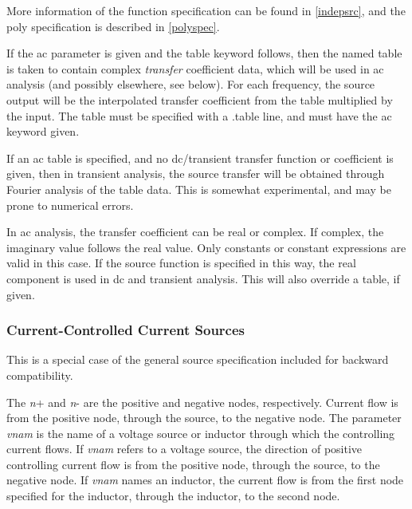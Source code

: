 More information of the function specification can be found in
\ref{indepsrc}, and the {\vt poly} specification is described in
\ref{polyspec}.

If the {\vt ac} parameter is given and the {\vt table} keyword
follows, then the named table is taken to contain complex {\it
transfer} coefficient data, which will be used in ac analysis (and
possibly elsewhere, see below).  For each frequency, the source output
will be the interpolated transfer coefficient from the table
multiplied by the input.  The table must be specified with a {\vt
.table} line, and must have the {\vt ac} keyword given.

If an ac table is specified, and no dc/transient transfer function or
coefficient is given, then in transient analysis, the source transfer
will be obtained through Fourier analysis of the table data.  This is
somewhat experimental, and may be prone to numerical errors.

In ac analysis, the transfer coefficient can be real or complex.  If
complex, the imaginary value follows the real value.  Only constants
or constant expressions are valid in this case.  If the source
function is specified in this way, the real component is used in dc
and transient analysis.  This will also override a table, if given.

\subsubsection{Current-Controlled Current Sources}


This is a special case of the general source specification included
for backward compatibility.


The {\it n\/}{\vt +} and {\it n\/}{\vt -} are the positive and
negative nodes, respectively.  Current flow is from the positive node,
through the source, to the negative node.  The parameter {\it vnam\/}
is the name of a voltage source or inductor through which the
controlling current flows.  If {\it vnam} refers to a voltage source,
the direction of positive controlling current flow is from the
positive node, through the source, to the negative node.  If {\it
vnam} names an inductor, the current flow is from the first node
specified for the inductor, through the inductor, to the second node. 


